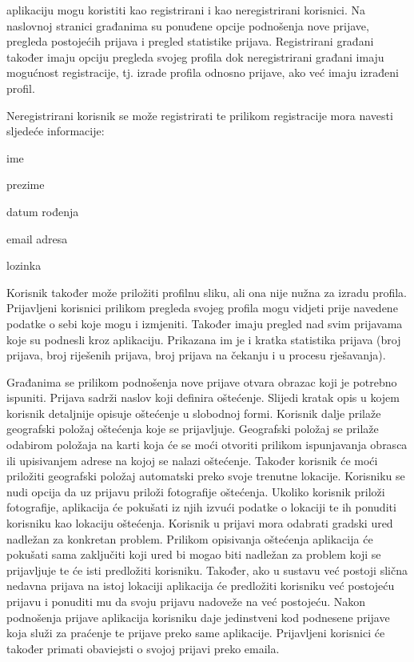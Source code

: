 		 aplikaciju mogu koristiti kao registrirani i kao neregistrirani korisnici. Na naslovnoj stranici građanima su ponuđene opcije podnošenja nove prijave, pregleda postojećih prijava i pregled statistike prijava. Registrirani građani također imaju opciju pregleda svojeg profila dok neregistrirani građani imaju mogućnost registracije, tj. izrade profila odnosno prijave, ako već imaju izrađeni profil.
		
		Neregistrirani korisnik se može registrirati te prilikom registracije mora navesti sljedeće informacije:
		\begin{packed_item}
			\item ime
			\item prezime
			\item datum rođenja
			\item email adresa
			\item lozinka
		\end{packed_item}  
		Korisnik također može priložiti profilnu sliku, ali ona nije nužna za izradu profila. Prijavljeni korisnici prilikom pregleda svojeg profila mogu vidjeti prije navedene podatke o sebi koje mogu i izmjeniti. Također imaju pregled nad svim prijavama koje su podnesli kroz aplikaciju. Prikazana im je i kratka statistika prijava (broj prijava, broj riješenih prijava, broj prijava na čekanju i u procesu rješavanja). 
		
		Građanima se prilikom podnošenja nove prijave otvara obrazac koji je potrebno ispuniti. Prijava sadrži naslov koji definira oštećenje. Slijedi kratak opis u kojem korisnik detaljnije opisuje oštećenje u slobodnoj formi. Korisnik dalje prilaže geografski položaj oštećenja koje se prijavljuje. Geografski položaj se prilaže odabirom položaja na karti koja će se moći otvoriti prilikom ispunjavanja obrasca ili upisivanjem adrese na kojoj se nalazi oštećenje. Također korisnik će moći priložiti geografski položaj automatski preko svoje trenutne lokacije. Korisniku se nudi opcija da uz prijavu priloži fotografije oštećenja. Ukoliko korisnik priloži fotografije, aplikacija će pokušati iz njih izvući podatke o lokaciji te ih ponuditi korisniku kao lokaciju oštećenja. Korisnik u prijavi mora odabrati gradski ured nadležan za konkretan problem. Prilikom opisivanja oštećenja aplikacija će pokušati sama zaključiti koji ured bi mogao biti nadležan za problem koji se prijavljuje te će isti predložiti korisniku. Također, ako u sustavu već postoji slična nedavna prijava na istoj lokaciji aplikacija će predložiti korisniku već postojeću prijavu i ponuditi mu da svoju prijavu nadoveže na već postojeću. Nakon podnošenja prijave aplikacija korisniku daje jedinstveni kod podnesene prijave koja služi za praćenje te prijave preko same aplikacije. Prijavljeni korisnici će također primati obaviejsti o svojoj prijavi preko emaila.
		
